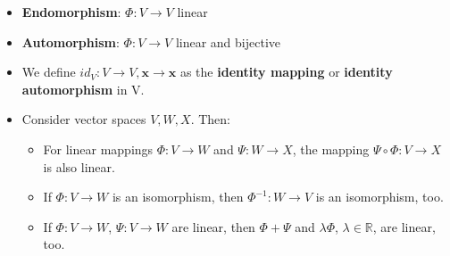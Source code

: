 \begin{itemize}
    \item \textbf{Endomorphism}: $\Phi : V \rightarrow V$ linear

    \item \textbf{Automorphism}: $\Phi : V \rightarrow V$ linear and bijective

    \item We define $id_V : V \rightarrow V , \mathbf{x} \rightarrow \mathbf{x}$ as the \textbf{identity mapping} or \textbf{identity automorphism} in V.

    \item Consider vector spaces $V, W, X$. Then:
    \begin{itemize}
        \item For linear mappings $\Phi : V \rightarrow W$ and $\Psi : W \rightarrow X$, the mapping $\Psi \circ \Phi : V \rightarrow X$ is also linear.

        \item If $\Phi : V \rightarrow W$ is an isomorphism, then $\Phi^{-1} : W \rightarrow V$ is an isomorphism, too.

        \item If $\Phi : V \rightarrow W$, $\Psi : V \rightarrow W$ are linear, then $\Phi + \Psi$ and $\lambda\Phi$, $\lambda \in \mathbb{R}$, are linear, too.
    \end{itemize}
    
\end{itemize}












